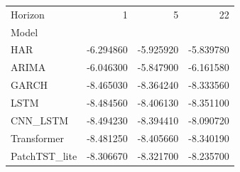 \begin{tabular}{lrrr}
\toprule
Horizon & 1 & 5 & 22 \\
Model &  &  &  \\
\midrule
HAR & -6.294860 & -5.925920 & -5.839780 \\
ARIMA & -6.046300 & -5.847900 & -6.161580 \\
GARCH & -8.465030 & -8.364240 & -8.333560 \\
LSTM & -8.484560 & -8.406130 & -8.351100 \\
CNN_LSTM & -8.494230 & -8.394410 & -8.090720 \\
Transformer & -8.481250 & -8.405660 & -8.340190 \\
PatchTST_lite & -8.306670 & -8.321700 & -8.235700 \\
\bottomrule
\end{tabular}
